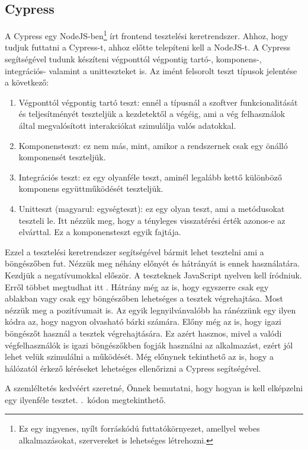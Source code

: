 \documentclass[]{thesis-ekf}
\theoremstyle{definition}
\theoremstyle{remark}
\begin{document}
	\subsection{Cypress}
		A Cypress egy NodeJS-ben\footnote{Ez egy ingyenes, nyílt forráskódú futtatókörnyezet, amellyel webes alkalmazásokat, szervereket is lehetséges létrehozni.} írt frontend tesztelési keretrendszer. Ahhoz, hogy tudjuk futtatni a Cypress-t, ahhoz előtte telepíteni kell a NodeJS-t. A Cypress segítségével tudunk készíteni végponttól végpontig tartó-, komponens-, integrációs- valamint a unitteszteket is.
		Az imént felsorolt teszt típusok jelentése a következő:
		\begin{enumerate}
			\item Végponttól végpontig tartó teszt: ennél a típusnál a szoftver funkcionalitását és teljesítményét teszteljük a kezdetektől a végéig, ami a vég felhasználok által megvalósított interakciókat szimulálja valós adatokkal.
			\item Komponensteszt: ez nem más, mint, amikor a rendszernek csak egy önálló komponensét teszteljük.
			\item Integrációs teszt: ez egy olyanféle teszt, aminél legalább kettő különböző komponens együttműködését teszteljük.
			\item Unitteszt (magyarul: egységteszt): ez egy olyan teszt, ami a metódusokat teszteli le. Itt nézzük meg, hogy a tényleges visszatérési érték azonos-e az elvárttal. Ez a komponensteszt egyik fajtája.
		\end{enumerate}
		Ezzel a tesztelési keretrendszer segítségével bármit lehet tesztelni ami a böngészőben fut. Nézzük meg néhány előnyét és hátrányát is ennek használatára. Kezdjük a negatívumokkal először. A teszteknek JavaScript nyelven kell íródniuk. Erről többet megtudhat itt . Hátrány még az is, hogy egyszerre csak egy ablakban vagy csak egy böngészőben lehetséges a tesztek végrehajtása. Most nézzük meg a pozitívumait is. Az egyik legnyilvánvalóbb ha ránézzünk egy ilyen kódra az, hogy nagyon olvasható bárki számára. Előny még az is, hogy igazi böngészőt használ a tesztek végrehajtására. Ez azért hasznos, mivel a valódi végfelhasználók is igazi böngészőkben fogják használni az alkalmazást, ezért jól lehet velük szimulálni a működését. Még előnynek tekinthető az is, hogy a hálózatól érkező kéréseket lehetséges ellenőrizni a Cypress segítségével.
		\cite{Cypress, Kusper Szoftvertesztles, Katalon, Medium, NodeJS}
		
		A szemléltetés kedvéért szeretné, Önnek bemutatni, hogy hogyan is kell elképzelni egy ilyenféle tesztet. .~kódon megtekinthető.
		
\end{document}
